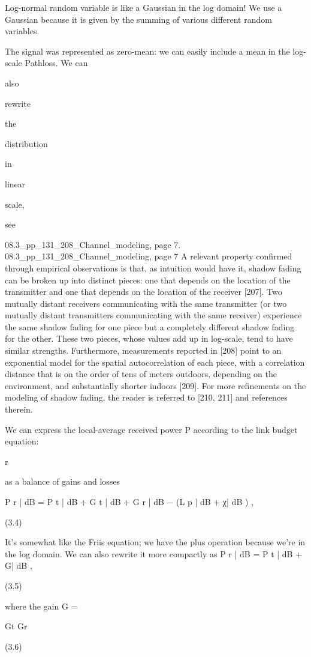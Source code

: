 {{{Log-normal random variable is like a Gaussian in the log domain! We use a Gaussian because it is given by the summing of various different random variables.

The signal was represented as zero-mean: we can easily include a mean in the log-scale Pathloss.
We can

also

rewrite

the

distribution

in

linear

scale,

see

08.3_pp_131_208_Channel_modeling, page 7.
08.3_pp_131_208_Channel_modeling, page 7 A relevant property confirmed through empirical observations is that, as intuition would have it, shadow fading can be broken up into distinct pieces: one that depends on the location of the transmitter and one that depends on the location of the receiver [207]. Two mutually distant receivers communicating with the same transmitter (or two mutually distant transmitters communicating with the same receiver) experience the same shadow fading for one piece but a completely different shadow fading for the other. These two pieces, whose values add up in log-scale,
tend to have similar strengths. Furthermore, measurements reported in [208] point to an exponential model for the spatial autocorrelation of each piece, with a correlation distance that is on the order of tens of meters outdoors, depending on the environment, and substantially shorter indoors [209]. For more refinements on the modeling of shadow fading, the reader is referred to [210, 211] and references therein.

We can express the local-average received power P according to the link budget equation:

r

as a balance of gains and losses

P r | dB = P t | dB + G t | dB + G r | dB − (L p | dB + χ| dB ) ,

(3.4)

It's somewhat like the Friis equation; we have the plus operation because we're in the log domain.
We can also rewrite it more compactly as P r | dB = P t | dB + G| dB ,

(3.5)

where the gain G =

Gt Gr

(3.6)

}}}
